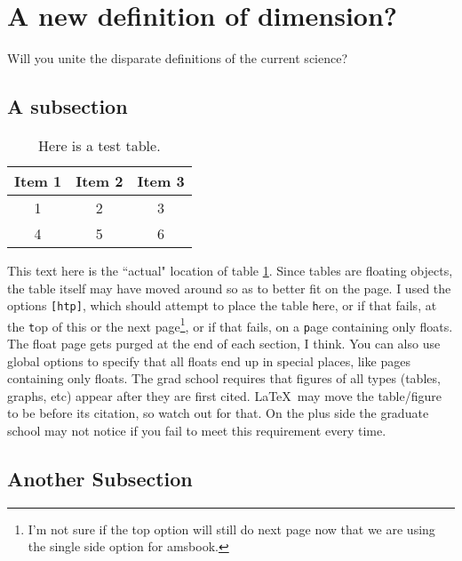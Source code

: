\documentclass{csuthesis} %
\begin{document}
\section{A new definition of dimension?}

Will you unite the disparate definitions of the current science? \lipsum[1]

\subsection{A subsection}

\begin{table}[htp]
\caption[Test table]{Here is a test table.}
\label{table:faketable}
\begin{tabular}{|c|c|c|}
\hline
Item 1 & Item 2 & Item 3\\
\hline
1 & 2 & 3 \\
4 & 5 & 6 \\
\hline
\end{tabular}
\end{table}

This text here is the ``actual" location of table \ref{table:faketable}.  Since tables are floating objects, the table itself may have moved around so as to better fit on the page.  I used the options \verb-[htp]-, which should attempt to place the table \verb-h-ere, or if that fails, at the \verb-t-op of this or the next page\footnote{I'm not sure if the top option will still do next page now that we are using the single side option for amsbook.}, or if that fails, on a \verb-p-age containing only floats.  The float page gets purged at the end of each section, I think.  You can also use global options to specify that all floats end up in special places, like pages containing only floats.  The grad school requires that figures of all types (tables, graphs, etc) appear after they are first cited.  \LaTeX\ may move the table/figure to be before its citation, so watch out for that.  On the plus side the graduate school may not notice if you fail to meet this requirement every time.

\subsection{Another Subsection}
\end{document}
